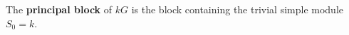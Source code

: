 \begin{definition}
\label{def:principal-block}
The \textbf{principal block} of $kG$ is the block containing the trivial simple module $S_0 = k$.
\end{definition}
